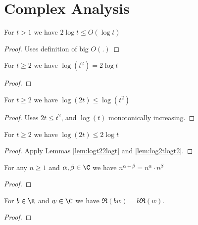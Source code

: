 \chapter{Complex Analysis}\label{complex_analysis}


\begin{lemma}\label{lem:2logOlog}  \leanok
For $t> 1$ we have $2\log t \le O(\log t)$
\end{lemma}
\begin{proof} \leanok
Uses definition of big $O(.)$
\end{proof}

\begin{lemma}\label{lem:logt22logt}  \leanok
For $t\ge 2$ we have $\log(t^2) = 2\log t$
\end{lemma}
\begin{proof}
\leanok
\end{proof}

\begin{lemma}\label{lem:log2tlogt2}  \leanok
For $t\ge 2$ we have $\log(2t) \le \log(t^2)$
\end{lemma}
\begin{proof} \leanok
Uses $2t \le t^2$, and $\log(t)$ monotonically increasing.
\end{proof}

\begin{lemma}\label{lem:log22log}  \leanok
For $t\ge 2$ we have $\log(2t) \le 2\log t$
\end{lemma}
\begin{proof} \leanok {}
Apply Lemmas \ref{lem:logt22logt} and \ref{lem:log2tlogt2}.
\end{proof}


\begin{lemma}\label{lem:exprule}  \leanok
For any $n\ge1$ and $\alpha,\beta\in\C$ we have $n^{\alpha+\beta} = n^\alpha\cdot n^{\beta}$
\end{lemma}
\begin{proof} \leanok
\end{proof}


\begin{lemma}\label{lem:realbw}  \leanok
For $b\in\R$ and $w\in\C$ we have $\Re(bw) = b\Re(w)$.
\end{lemma}
\begin{proof} \leanok
\end{proof}

